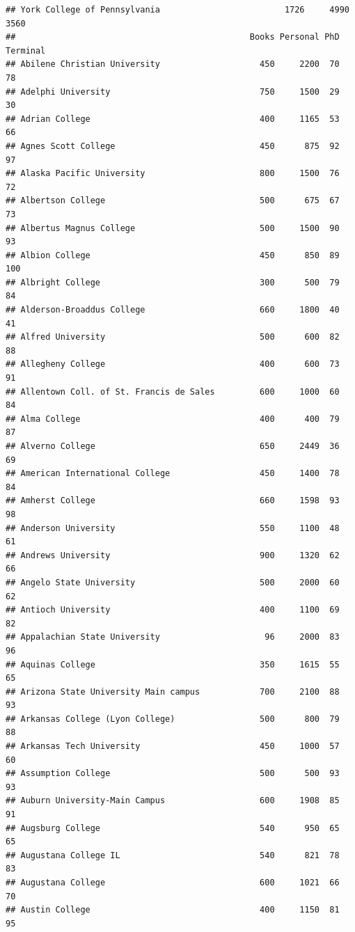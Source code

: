 \documentclass[
]{article}
\begin{document}
\begin{verbatim}
## York College of Pennsylvania                         1726     4990       3560
##                                               Books Personal PhD Terminal
## Abilene Christian University                    450     2200  70       78
## Adelphi University                              750     1500  29       30
## Adrian College                                  400     1165  53       66
## Agnes Scott College                             450      875  92       97
## Alaska Pacific University                       800     1500  76       72
## Albertson College                               500      675  67       73
## Albertus Magnus College                         500     1500  90       93
## Albion College                                  450      850  89      100
## Albright College                                300      500  79       84
## Alderson-Broaddus College                       660     1800  40       41
## Alfred University                               500      600  82       88
## Allegheny College                               400      600  73       91
## Allentown Coll. of St. Francis de Sales         600     1000  60       84
## Alma College                                    400      400  79       87
## Alverno College                                 650     2449  36       69
## American International College                  450     1400  78       84
## Amherst College                                 660     1598  93       98
## Anderson University                             550     1100  48       61
## Andrews University                              900     1320  62       66
## Angelo State University                         500     2000  60       62
## Antioch University                              400     1100  69       82
## Appalachian State University                     96     2000  83       96
## Aquinas College                                 350     1615  55       65
## Arizona State University Main campus            700     2100  88       93
## Arkansas College (Lyon College)                 500      800  79       88
## Arkansas Tech University                        450     1000  57       60
## Assumption College                              500      500  93       93
## Auburn University-Main Campus                   600     1908  85       91
## Augsburg College                                540      950  65       65
## Augustana College IL                            540      821  78       83
## Augustana College                               600     1021  66       70
## Austin College                                  400     1150  81       95

\end{verbatim}
\end{document}
